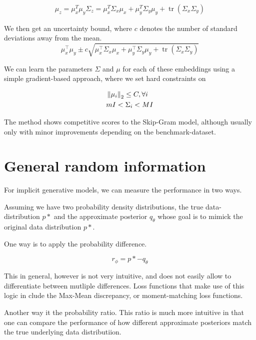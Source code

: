 \documentclass[a4paper,12pt,twoside,openright]{report}
\begin{document}
\begin{align}
\mu_z = \mu_x^T \mu_y
\Sigma_z = \mu_{x}^T \Sigma_{x} \mu_{x}+\mu_{y}^T \Sigma_{y} \mu_{y}+\operatorname{tr}\left(\Sigma_{x} \Sigma_{y}\right)
\end{align}

We then get an uncertainty bound, where $c$ denotes the number of standard deviations away from the mean.
\begin{equation}
\mu_{x}^{\top} \mu_{y} \pm c \sqrt{\mu_{x}^{\top} \Sigma_{x} \mu_{x}+\mu_{y}^{\top} \Sigma_{y} \mu_{y}+\operatorname{tr}\left(\Sigma_{x} \Sigma_{y}\right)}
\end{equation}

We can learn the parameters $\Sigma$ and $\mu$ for each of these embeddings using a simple gradient-based approach, where we set hard constraints on 

\begin{align}
& \left\lVert \mu_i \right\rVert_2  \leq C, \forall i \\
& m I <  \Sigma_i < M I
\end{align}

The method shows competitive scores to the Skip-Gram model, although usually only with minor improvements depending on the benchmark-dataset.


\section{General random information}

For implicit generative models, we can measure the performance in two ways.

Assuming we have two probability density distributions, the true data-distribution $p*$ and the approximate posterior $q_\theta$ whose goal is to mimick the original data distribution $p*$.

One way is to apply the probability difference.

\begin{equation}
r_{\phi} = p* - q_\theta
\end{equation}

This in general, however is not very intuitive, and does not easily allow to differentiate between mutliple differences.
Loss functions that make use of this logic in clude the Max-Mean discrepancy, or moment-matching loss functions.

Another way it the probability ratio.
This ratio is much more intuitive in that one can compare the performance of how different approximate posteriors match the true underlying data distributiion.
\end{document}
